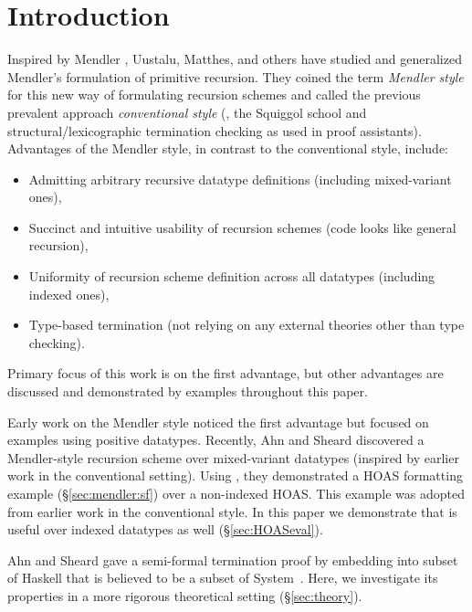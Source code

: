 \section{Introduction}\label{sec:intro}

Inspired by Mendler \cite{Mendler87}, Uustalu, Matthes, and others
\cite{UusVen99,UusVen00,AbeMatUus03,AbeMatUus05,AbeMat04} have studied
and generalized Mendler's formulation of primitive recursion. They coined
the term \emph{Mendler style} for this new way of formulating recursion schemes
and called the previous prevalent approach \emph{conventional style} (\eg,
the Squiggol school and structural/lexicographic termination checking
as used in proof assistants). Advantages of the Mendler style, in contrast to
the conventional style, include:
\begin{itemize}
\item Admitting arbitrary recursive datatype definitions
	(including mixed-variant ones),
\item Succinct and intuitive usability of recursion schemes
	(code looks like general recursion),
\item Uniformity of recursion scheme definition across all datatypes
	(including indexed ones),
\item Type-based termination
	(not relying on any external theories other than type checking).
\end{itemize}
Primary focus of this work is on the first advantage, but other advantages
are discussed and demonstrated by examples throughout this paper.

Early work \cite{UusVen99,UusVen00,AbeMatUus03,AbeMatUus05,AbeMat04} on
the Mendler style noticed the first advantage but focused on examples
using positive datatypes. Recently, Ahn and Sheard \cite{AhnShe11}
discovered a Mendler-style recursion scheme \msfit{} over mixed-variant datatypes
(inspired by earlier work \cite{MeiHut95,FegShe96,bgb} in the conventional setting).
Using \msfit{}, they demonstrated a HOAS formatting example (\S\ref{sec:mendler:sf}) over
a non-indexed HOAS. This example was adopted from earlier work \cite{FegShe96,bgb} in
the conventional style. In this paper we demonstrate that \msfit{} is useful over
indexed datatypes as well (\S\ref{sec:HOASeval}).

Ahn and Sheard \cite{AhnShe11} gave a semi-formal termination proof by
embedding \msfit{} into subset of Haskell that is believed to be a subset of System~\Fw.
Here, we investigate its properties in a more rigorous theoretical
setting (\S\ref{sec:theory}).

